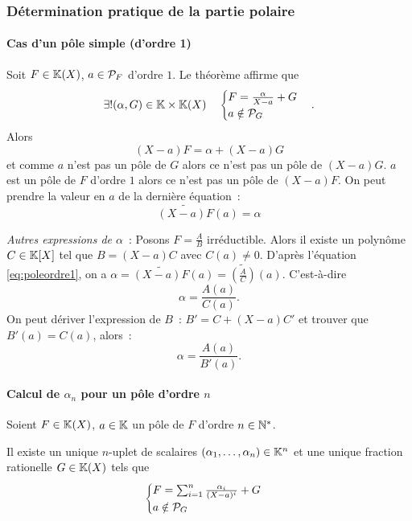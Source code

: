 \subsubsection{Détermination pratique de la partie polaire}

\paragraph{Cas d'un pôle simple (d'ordre 1)}

Soit $F\in\K(X)$, $a \in \P_F$ d'ordre $1$. Le théorème affirme que
\begin{equation}
  \exists! (\alpha,G) \in \K \times \K(X) \quad \begin{cases} F=\frac{\alpha}{X-a}+G \\ a \notin \P_G \end{cases}.
\end{equation}
Alors
\begin{equation}
  (X-a)F=\alpha+(X-a)G
\end{equation}
et comme $a$ n'est pas un pôle de $G$ alors ce n'est pas un pôle de $(X-a)G$. $a$ est un pôle de $F$ d'ordre $1$ alors ce n'est pas un pôle de $(X-a)F$. On peut prendre la valeur en $a$ de la dernière équation~:
\begin{equation}
  \widetilde{(X-a)F}(a)=\alpha \label{eq:poleordre1}
\end{equation}

\emph{Autres expressions de $\alpha$}~: Posons $F=\frac{A}{B}$ irréductible. Alors il existe un polynôme $C \in \K[X]$ tel que $B=(X-a)C$ avec $C(a)\neq 0$. D'après l'équation \eqref{eq:poleordre1}, on a $\alpha = \widetilde{(X-a)F}(a) = \widetilde{\left(\frac{A}{C}\right)}(a)$. C'est-à-dire
\begin{equation}
  \alpha = \frac{A(a)}{C(a)}.
\end{equation}
On peut dériver l'expression de $B$~: $B'=C+(X-a)C'$ et trouver que $B'(a)=C(a)$, alors~:
\begin{equation}
  \alpha = \frac{A(a)}{B'(a)}.
\end{equation}

\paragraph{Calcul de $\alpha_n$ pour un pôle d'ordre $n$}

Soient $F \in \K(X)$, $a\in\K$ un pôle de $F$ d'ordre $n \in \N^*$.

\begin{theo}
  Il existe un unique $n$-uplet de scalaires $(\alpha_1, \ldots, \alpha_n) \in \K^n$ et une unique fraction rationelle $G \in \K(X)$ tels que
  \begin{equation}
    \begin{cases}
      F = \sum_{i=1}^n \frac{\alpha_i}{(X-a)^i} +G \\
      a \notin \P_G
    \end{cases}
  \end{equation}
\end{theo}

